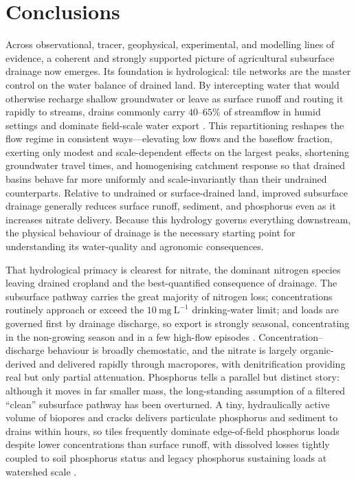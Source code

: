 \section{Conclusions}

Across observational, tracer, geophysical, experimental, and modelling lines
of evidence, a coherent and strongly supported picture of agricultural
subsurface drainage now emerges. Its foundation is hydrological: tile networks
are the master control on the water balance of drained land. By intercepting
water that would otherwise recharge shallow groundwater or leave as surface
runoff and routing it rapidly to streams, drains commonly carry $40$--$65\%$ of
streamflow in humid settings and dominate field-scale water export
\parencite{Schilling2019}. This
repartitioning reshapes the flow regime in consistent ways---elevating low
flows and the baseflow fraction, exerting only modest and scale-dependent
effects on the largest peaks, shortening groundwater travel times, and
homogenising catchment response so that drained basins behave far more
uniformly and scale-invariantly than their undrained counterparts. Relative to
undrained or surface-drained land, improved subsurface drainage generally
reduces surface runoff, sediment, and phosphorus even as it increases nitrate
delivery. Because this hydrology governs everything downstream, the physical
behaviour of drainage is the necessary starting point for understanding its
water-quality and agronomic consequences.

That hydrological primacy is clearest for nitrate, the dominant nitrogen
species leaving drained cropland and the best-quantified consequence of
drainage. The subsurface pathway carries the great majority of nitrogen loss;
concentrations routinely approach or exceed the $10~\mathrm{mg~L^{-1}}$
drinking-water limit; and loads are governed first by drainage discharge, so
export is strongly seasonal, concentrating in the non-growing season and in a
few high-flow episodes \parencite{Kladivko2021,Speir2021}. Concentration--discharge behaviour is broadly
chemostatic, and the nitrate is largely organic-derived and delivered rapidly
through macropores, with denitrification providing real but only partial
attenuation. Phosphorus tells a parallel but distinct story: although it moves
in far smaller mass, the long-standing assumption of a filtered ``clean''
subsurface pathway has been overturned. A tiny, hydraulically active volume of
biopores and cracks delivers particulate phosphorus and sediment to drains
within hours, so tiles frequently dominate edge-of-field phosphorus loads
despite lower concentrations than surface runoff, with dissolved losses tightly
coupled to soil phosphorus status and legacy phosphorus sustaining loads at
watershed scale \parencite{Pease2018,Sharpley1995}.

